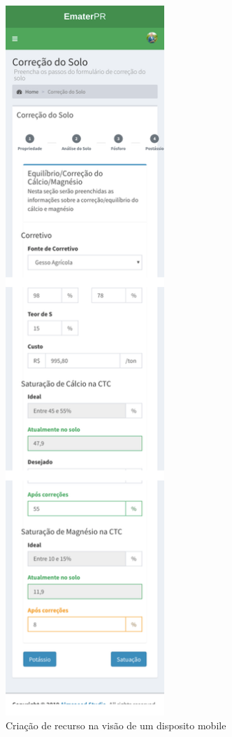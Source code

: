 \begin{figure}[H]
    \centering
    \includegraphics[width=6cm]{./dados/figuras/prototipos/create_mobile.png}
    \caption{Criação de recurso na visão de um disposito mobile}
    \label{fig:prototipo_create_mobile}
\end{figure}


